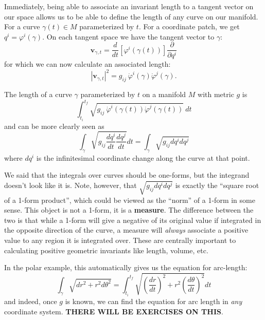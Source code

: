 	Immediately, being able to associate an invariant length to a tangent vector on our space allows us to be able to define the length of any curve on our manifold. For a curve $\gamma(t) \in M$ parameterized by $t$. For a coordinate patch, we get $q^i = \varphi^i(\gamma)$. On each tangent space we have the tangent vector to $\gamma$:
	\begin{equation}
		\mathbf v_{\gamma,t} = \frac{d}{dt} \left[ \varphi^i(\gamma(t)) \right] \frac{\partial}{\partial q^i}
	\end{equation}
	for which we can now calculate an associated length: 
	\begin{equation}
		|\mathbf v_{\gamma,t}|^2 = g_{ij} ~ \dot \varphi^i(\gamma) \dot \varphi^j(\gamma).
	\end{equation}
	\begin{prop}
		The length of a curve $\gamma$ parameterized by $t$ on a manifold $M$ with metric $g$ is
		\begin{equation}
			\int_{t_i}^{t_f} \sqrt{g_{ij} ~ \dot \varphi^i(\gamma(t)) \dot \varphi^j(\gamma(t))} ~ dt
		\end{equation}
		and can be more clearly seen as
		\begin{equation}
			\int_{\gamma} \sqrt{g_{ij} \frac{dq^i}{dt} \frac{dq^j}{dt}} dt = \int_{\gamma} \sqrt{g_{ij} dq^i dq^j}
		\end{equation}
		where $dq^i$ is the infinitesimal coordinate change along the curve at that point.
	\end{prop}
	We said that the integrals over curves should be one-forms, but the integrand doesn't look like it is. Note, however, that $\sqrt{g_{ij} dq^i dq^j}$ is exactly the ``square root of a 1-form product'', which could be viewed as the ``norm'' of a 1-form in some sense. This object is not a 1-form, it is a \textbf{measure}. The difference between the two is that while a 1-form will give a negative of its original value if integrated in the opposite direction of the curve, a measure will \emph{always} associate a positive value to any region it is integrated over. These are centrally important to calculating positive geometric invariants like length, volume, etc. 
	
	In the polar example, this automatically gives us the equation for arc-length:
	\begin{equation}
		\int_{\gamma} \sqrt{dr^2 + r^2 d\theta^2} 
		= \int_{t_i}^{t_f} \sqrt{\left( \frac{dr}{dt}\right)^2+ r^2 \left( \frac{d\theta}{dt} \right)^2 } dt
	\end{equation}
	and indeed, once $g$ is known, we can find the equation for arc length in \emph{any} coordinate system. \textbf{THERE WILL BE EXERCISES ON THIS}.
	
